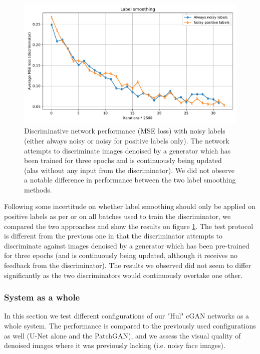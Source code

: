 \begin{figure}[!htbp]
\centering
\includegraphics[width=1\linewidth]{gfx/graphs/label-smoothing.pdf}
\caption[Discriminative network performance with noisy labels (always noisy or noisy for positive labels only)]{Discriminative network performance (\ac{MSE} loss) with noisy labels (either always noisy or noisy for positive labels only). The network attempts to discriminate images denoised by a generator which has been trained for three epochs and is continuously being updated (alas without any input from the discriminator). We did not observe a notable difference in performance between the two label smoothing methods.}
\label{fig:label-smoothing}
\end{figure}

Following some incertitude on whether label smoothing should only be applied on positive labels as per \cite{gantechniques} or on all batches used to train the discriminator, we compared the two approaches and show the results on figure \ref{fig:label-smoothing}. The test protocol is different from the previous one in that the discriminator attempts to discriminate against images denoised by a generator which has been pre-trained for three epochs (and is continuously being updated, although it receives no feedback from the discriminator). The results we observed did not seem to differ significantly as the two discriminators would continuously overtake one other.

\subsubsection{System as a whole}\label{sec:System as a whole}

In this section we test different configurations of our "Hul" \ac{cGAN} networks as a whole system. The performance is compared to the previously used configurations as well (U-Net alone and the PatchGAN), and we assess the visual quality of denoised images where it was previously lacking (i.e. noisy face images).

